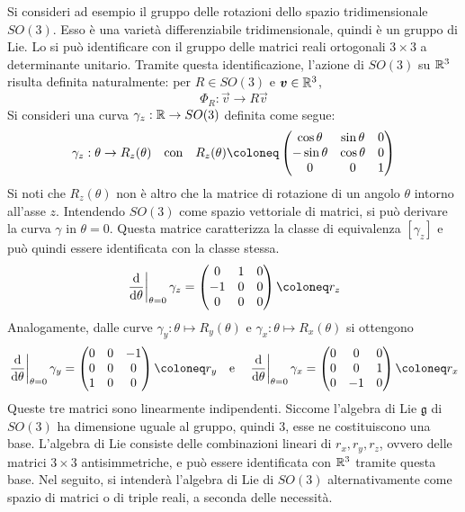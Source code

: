 Si consideri ad esempio il gruppo delle rotazioni dello spazio tridimensionale $SO(3)$. Esso è una varietà differenziabile tridimensionale, quindi è un gruppo di Lie. Lo si può identificare con il gruppo delle matrici reali ortogonali $3\times 3$ a determinante unitario. Tramite questa identificazione, l'azione di $SO(3)$ su $\mathbb{R}^3$ risulta definita naturalmente: per $R \in SO(3)$ e $\boldsymbol{v} \in \mathbb{R}^3$, 
\begin{equation}
\Phi_R: \vec{v}\to R\vec{v}
\end{equation} 
Si consideri una curva $\gamma_z: \mathbb{R} \to SO(3)$ definita come segue:
\begin{equation}
\gamma_z: \theta \to R_z(\theta) \qqtext{con} R_z(\theta) \defeq \pmqty{\cos \theta & \sin \theta & 0 \\ -\sin \theta & \cos \theta & 0 \\ 0 & 0 & 1}
\end{equation}
Si noti che $R_z(\theta)$ non è altro che la matrice di rotazione di un angolo $\theta$ intorno all'asse $z$. Intendendo $SO(3)$ come spazio vettoriale di matrici, si può derivare la curva $\gamma$ in $\theta=0$. Questa matrice caratterizza la classe di equivalenza $[\gamma_z]$ e può quindi essere identificata con la classe stessa. 
\begin{equation}
\eval{\dv{\theta}}_{\theta=0}\gamma_z = \pmqty{0 & 1 & 0 \\ -1 & 0 & 0 \\ 0 & 0 & 0} \defeq r_z
\end{equation}
Analogamente, dalle curve $\gamma_y: \theta\mapsto R_y(\theta)$ e $\gamma_x: \theta \mapsto R_x(\theta)$ si ottengono 
\begin{equation}
  \eval{\dv{\theta}}_{\theta=0}\gamma_y = \pmqty{0 & 0 & -1 \\ 0 & 0 & 0 \\ 1 & 0 & 0} \defeq r_y \qqtext{e} \eval{\dv{\theta}}_{\theta=0}\gamma_x = \pmqty{0 & 0 & 0 \\ 0 & 0 & 1 \\ 0 & -1 & 0} \defeq r_x
\end{equation}
Queste tre matrici sono linearmente indipendenti. Siccome l'algebra di Lie $\mathfrak{g}$ di $SO(3)$ ha dimensione uguale al gruppo, quindi $3$, esse ne costituiscono una base. L'algebra di Lie consiste delle combinazioni lineari di $r_x, r_y, r_z$, ovvero delle matrici $3\times 3$ antisimmetriche, e può essere identificata con $\mathbb{R}^3$ tramite questa base.  Nel seguito, si intenderà l'algebra di Lie di $SO(3)$ alternativamente come spazio di matrici o di triple reali, a seconda delle necessità.

